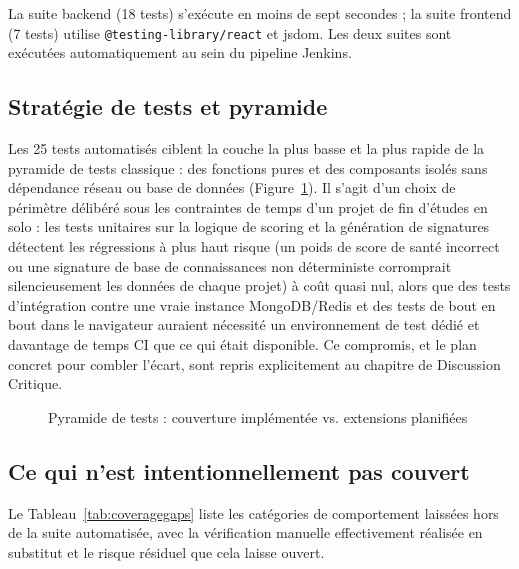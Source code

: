 \documentclass[12pt,a4paper,oneside]{report}
\begin{document}
La suite backend (18 tests) s'exécute en moins de sept secondes ; la suite frontend (7 tests) utilise \texttt{@testing-library/react} et jsdom. Les deux suites sont exécutées automatiquement au sein du pipeline Jenkins.

\subsection{Stratégie de tests et pyramide}
Les 25 tests automatisés ciblent la couche la plus basse et la plus rapide de la pyramide de tests classique : des fonctions pures et des composants isolés sans dépendance réseau ou base de données (Figure~\ref{fig:testpyramid}). Il s'agit d'un choix de périmètre délibéré sous les contraintes de temps d'un projet de fin d'études en solo : les tests unitaires sur la logique de scoring et la génération de signatures détectent les régressions à plus haut risque (un poids de score de santé incorrect ou une signature de base de connaissances non déterministe corromprait silencieusement les données de chaque projet) à coût quasi nul, alors que des tests d'intégration contre une vraie instance MongoDB/Redis et des tests de bout en bout dans le navigateur auraient nécessité un environnement de test dédié et davantage de temps CI que ce qui était disponible. Ce compromis, et le plan concret pour combler l'écart, sont repris explicitement au chapitre de Discussion Critique.

\begin{figure}[H]\centering
{}
\caption{Pyramide de tests : couverture implémentée vs. extensions planifiées}\label{fig:testpyramid}
\end{figure}

\subsection{Ce qui n'est intentionnellement pas couvert}
Le Tableau~\ref{tab:coveragegaps} liste les catégories de comportement laissées hors de la suite automatisée, avec la vérification manuelle effectivement réalisée en substitut et le risque résiduel que cela laisse ouvert.
\end{document}
